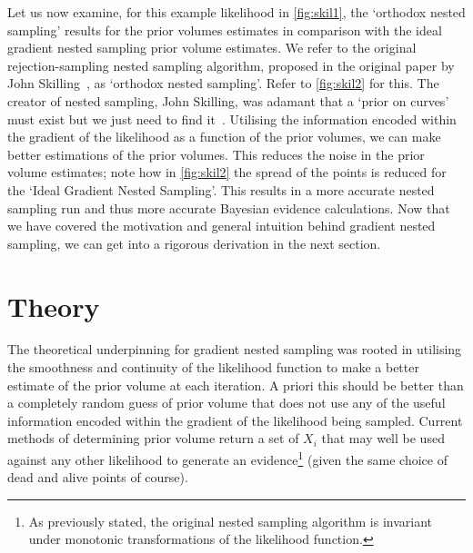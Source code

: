 Let us now examine, for this example likelihood in \cref{fig:skil1}, the `orthodox nested sampling' results for the prior volumes estimates in comparison with the ideal gradient nested sampling prior volume estimates. We refer to the original rejection-sampling nested sampling algorithm, proposed in the original paper by John Skilling~\cite{10.1214/06-BA127}, as `orthodox nested sampling'. Refer to \cref{fig:skil2} for this. The creator of nested sampling, John Skilling, was adamant that a `prior on curves' must exist but we just need to find it~\cite{paris2022}. Utilising the information encoded within the gradient of the likelihood as a function of the prior volumes, we can make better estimations of the prior volumes. This reduces the noise in the prior volume estimates; note how in \cref{fig:skil2} the spread of the points is reduced for the `Ideal Gradient Nested Sampling'. This results in a more accurate nested sampling run and thus more accurate Bayesian evidence calculations. Now that we have covered the motivation and general intuition behind gradient nested sampling, we can get into a rigorous derivation in the next section.




\section{\label{sec:level2}Theory}

The theoretical underpinning for gradient nested sampling was rooted in utilising the smoothness and continuity of the likelihood function to make a better estimate of the prior volume at each iteration. A priori this should be better than a completely random guess of prior volume that does not use any of the useful information encoded within the gradient of the likelihood being sampled. Current methods of determining prior volume return a set of $X_i$ that may well be used against any other likelihood to generate an evidence\footnote{As previously stated, the original nested sampling algorithm is invariant under monotonic transformations of the likelihood function.} (given the same choice of dead and alive points of course). 

